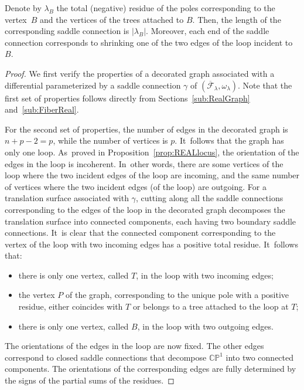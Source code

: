 \begin{lem}
Denote by $\lambda_{B}$ the total (negative) residue of the poles corresponding to the vertex~$B$ and the vertices of the trees attached to $B$. Then, the length of the corresponding saddle connection is $|\lambda_{B}|$. Moreover, each end of the saddle connection corresponds to shrinking one of the two edges of the loop incident to $B$.
\end{lem}

\begin{proof}
We first verify the properties of a decorated graph associated with a differential parameterized by a saddle connection $\gamma$ of $(\overline{\mathcal{F}}_{\lambda}, \omega_\lambda)$. Note that the first set of properties follows directly from Sections~\ref{sub:RealGraph} and~\ref{sub:FiberReal}.

For the second set of properties, the number of edges in the decorated graph is $n+p-2=p$, while the number of vertices is $p$. It~follows that the graph has only one loop. As~proved in Proposition~\ref{prop:REALlocus}, the orientation of the edges in the loop is incoherent. In~other words, there are some vertices of the loop where the two incident edges of the loop are incoming, and the same number of vertices where the two incident edges (of the loop) are outgoing. For a translation surface associated with $\gamma$, cutting along all the saddle connections corresponding to the edges of the loop in the decorated graph decomposes the translation surface into connected components, each having two boundary saddle connections. It~is clear that the connected component corresponding to the vertex of the loop with two incoming edges has a positive total residue. It~follows that:
\begin{itemize}
\item there is only one vertex, called $T$, in the loop with two incoming edges;
\item the vertex $P$ of the graph, corresponding to the unique pole with a positive residue, either coincides with $T$ or belongs to a tree attached to the loop at $T$;
\item there is only one vertex, called $B$, in the loop with two outgoing edges.
\end{itemize}
The orientations of the edges in the loop are now fixed. The other edges correspond to closed saddle connections that decompose $\mathbb{CP}^{1}$ into two connected components. The orientations of the corresponding edges are fully determined by the signs of the partial sums of the residues.


\end{proof}
